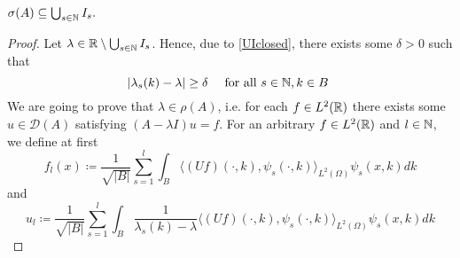  \begin{theorem} \label{4.1:thm-MainResult.SecondInclusion}

	$\sigma(A) \subseteq \bigcup_{s \in \mathbb{N}} I_{s}.$

	\begin{proof}
		Let $\lambda \in \mathbb{R} \setminus \bigcup_{s \in \mathbb{N}} I_{s}$. Hence, due to \eqref{UIclosed}, there exists some $\delta > 0$ such that
			\begin{equation}
				|\lambda_{s}(k) - \lambda| \geq \delta \quad \text{ for all } s \in \N, k \in B \label{lambda-distance}
			\end{equation}
		We are going to prove that $\lambda \in \rho(A)$, i.e. for each $f \in L^{2}(\mathbb{R})$ there exists some $u \in \mathcal{D}(A)$ satisfying $(A-\lambda I)u = f$. For an arbitrary $f \in L^{2}(\mathbb{R})$ and $l \in \mathbb{N}$, we define at first
			\[ f_{l}(x) \coloneqq \frac{1}{\sqrt{|B|}} \sum_{s=1}^{l} \int_{B} \langle (Uf)(\cdot, k), \psi_{s}(\cdot, k)\rangle_{L^{2}(\Omega)} \psi_{s}(x,k) dk \]
			and
			\begin{equation}
				u_{l} \coloneqq \frac{1}{\sqrt{|B|}} \sum_{s=1}^{l} \int_{B} \frac{1}{\lambda_{s}(k) - \lambda} \langle (Uf)(\cdot, k), \psi_{s}(\cdot, k)\rangle_{L^{2}(\Omega)} \psi_{s}(x, k) dk \label{ul}
			\end{equation} 


\end{proof}
\end{theorem}
